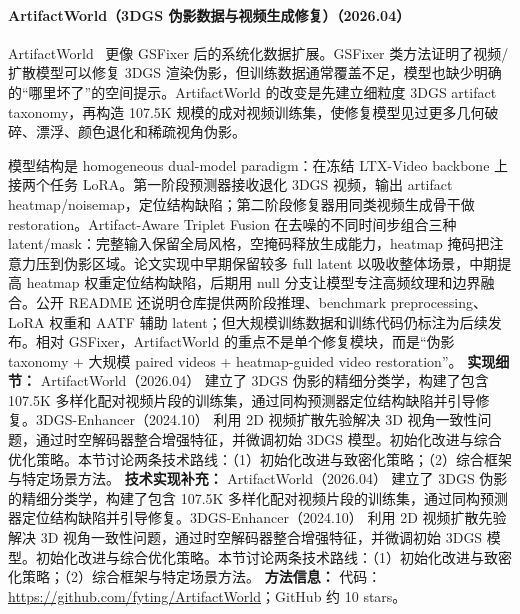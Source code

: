 \paragraph{ArtifactWorld（3DGS 伪影数据与视频生成修复）（2026.04）}
ArtifactWorld~\cite{2604_12251} 更像 GSFixer 后的系统化数据扩展。GSFixer 类方法证明了视频/扩散模型可以修复 3DGS 渲染伪影，但训练数据通常覆盖不足，模型也缺少明确的“哪里坏了”的空间提示。ArtifactWorld 的改变是先建立细粒度 3DGS artifact taxonomy，再构造 107.5K 规模的成对视频训练集，使修复模型见过更多几何破碎、漂浮、颜色退化和稀疏视角伪影。

模型结构是 homogeneous dual-model paradigm：在冻结 LTX-Video backbone 上接两个任务 LoRA。第一阶段预测器接收退化 3DGS 视频，输出 artifact heatmap/noisemap，定位结构缺陷；第二阶段修复器用同类视频生成骨干做 restoration。Artifact-Aware Triplet Fusion 在去噪的不同时间步组合三种 latent/mask：完整输入保留全局风格，空掩码释放生成能力，heatmap 掩码把注意力压到伪影区域。论文实现中早期保留较多 full latent 以吸收整体场景，中期提高 heatmap 权重定位结构缺陷，后期用 null 分支让模型专注高频纹理和边界融合。公开 README 还说明仓库提供两阶段推理、benchmark preprocessing、LoRA 权重和 AATF 辅助 latent；但大规模训练数据和训练代码仍标注为后续发布。相对 GSFixer，ArtifactWorld 的重点不是单个修复模块，而是“伪影 taxonomy + 大规模 paired videos + heatmap-guided video restoration”。
\textbf{实现细节：} ArtifactWorld（2026.04） 建立了 3DGS 伪影的精细分类学，构建了包含 107.5K 多样化配对视频片段的训练集，通过同构预测器定位结构缺陷并引导修复。3DGS-Enhancer（2024.10） 利用 2D 视频扩散先验解决 3D 视角一致性问题，通过时空解码器整合增强特征，并微调初始 3DGS 模型。初始化改进与综合优化策略。本节讨论两条技术路线：（1）初始化改进与致密化策略；（2）综合框架与特定场景方法。
\textbf{技术实现补充：} ArtifactWorld（2026.04） 建立了 3DGS 伪影的精细分类学，构建了包含 107.5K 多样化配对视频片段的训练集，通过同构预测器定位结构缺陷并引导修复。3DGS-Enhancer（2024.10） 利用 2D 视频扩散先验解决 3D 视角一致性问题，通过时空解码器整合增强特征，并微调初始 3DGS 模型。初始化改进与综合优化策略。本节讨论两条技术路线：（1）初始化改进与致密化策略；（2）综合框架与特定场景方法。
\textbf{方法信息：} 代码：\url{https://github.com/fyting/ArtifactWorld}；GitHub 约 10 stars。
